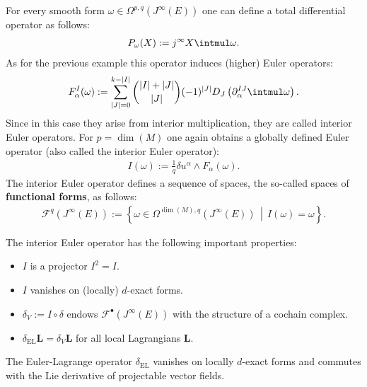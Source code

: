     \begin{example}
        For every smooth form $\omega\in\Omega^{p,q}(J^\infty(E))$ one can define a total differential operator as follows:
        \begin{gather}
            P_\omega(X) := j^\infty X\intmul\omega.
        \end{gather}
        As for the previous example this operator induces (higher) Euler operators:
        \begin{gather}
            \label{var:interior_euler_operators}
            F^I_\alpha(\omega) := \sum_{|J|=0}^{k-|I|}\binom{|I|+|J|}{|J|}(-1)^{|J|}D_J\left(\partial^{IJ}_\alpha\intmul\omega\right).
        \end{gather}
        Since in this case they arise from interior multiplication, they are called interior Euler operators. For $p=\dim(M)$ one again obtains a globally defined Euler operator (also called the interior Euler operator):
        \begin{gather}
            I(\omega) := \frac{1}{q}\delta u^\alpha\wedge F_\alpha(\omega).
        \end{gather}
        The interior Euler operator defines a sequence of spaces, the so-called spaces of \textbf{functional forms}, as follows:
        \begin{gather}
            \label{var:functional_complex}
            \mathcal{F}^q(J^\infty(E)) := \left\{\omega\in\Omega^{\dim(M),q}(J^\infty(E))\,\middle\vert\, I(\omega)=\omega\right\}.
        \end{gather}
    \end{example}
    \begin{property}\label{var:I_properties}
        The interior Euler operator has the following important properties:
        \begin{itemize}
            \item $I$ is a projector $I^2=I$.
            \item $I$ vanishes on (locally) $d$-exact forms.
            \item $\delta_V := I\circ\delta$ endows $\mathcal{F}^\bullet(J^\infty(E))$ with the structure of a cochain complex.
            \item $\delta_\mathrm{EL}\mathbf{L} = \delta_V\mathbf{L}$ for all local Lagrangians $\mathbf{L}$.
        \end{itemize}
    \end{property}
    \begin{result}\label{var:EL_operator_properties}
        The Euler-Lagrange operator $\delta_\mathrm{EL}$ vanishes on locally $d$-exact forms and commutes with the Lie derivative of projectable vector fields.
    \end{result}

